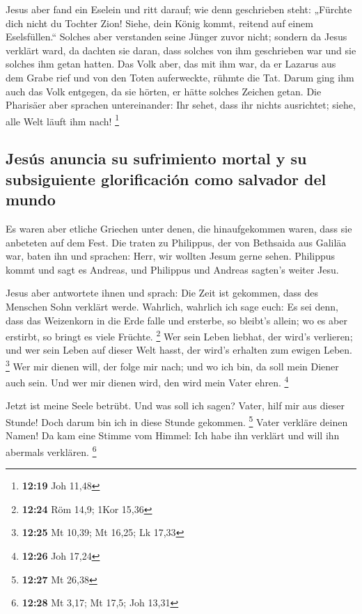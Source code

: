  Jesus aber fand ein Eselein und ritt darauf; wie denn
geschrieben steht:  „Fürchte dich nicht du Tochter Zion!
Siehe, dein König kommt, reitend auf einem Eselsfüllen.``
 Solches aber verstanden seine Jünger zuvor nicht;
sondern da Jesus verklärt ward, da dachten sie daran, dass solches von
ihm geschrieben war und sie solches ihm getan hatten. 
Das Volk aber, das mit ihm war, da er Lazarus aus dem Grabe rief und von
den Toten auferweckte, rühmte die Tat.  Darum ging ihm
auch das Volk entgegen, da sie hörten, er hätte solches Zeichen getan.
 Die Pharisäer aber sprachen untereinander: Ihr sehet,
dass ihr nichts ausrichtet; siehe, alle Welt läuft ihm nach! \footnote{\textbf{12:19}
  Joh 11,48}

\hypertarget{jesuxfas-anuncia-su-sufrimiento-mortal-y-su-subsiguiente-glorificaciuxf3n-como-salvador-del-mundo}{%
\subsection{Jesús anuncia su sufrimiento mortal y su subsiguiente
glorificación como salvador del
mundo}\label{jesuxfas-anuncia-su-sufrimiento-mortal-y-su-subsiguiente-glorificaciuxf3n-como-salvador-del-mundo}}

 Es waren aber etliche Griechen unter denen, die
hinaufgekommen waren, dass sie anbeteten auf dem Fest. 
Die traten zu Philippus, der von Bethsaida aus Galiläa war, baten ihn
und sprachen: Herr, wir wollten Jesum gerne sehen. 
Philippus kommt und sagt es Andreas, und Philippus und Andreas sagten's
weiter Jesu.

 Jesus aber antwortete ihnen und sprach: Die Zeit ist
gekommen, dass des Menschen Sohn verklärt werde. 
Wahrlich, wahrlich ich sage euch: Es sei denn, dass das Weizenkorn in
die Erde falle und ersterbe, so bleibt's allein; wo es aber erstirbt, so
bringt es viele Früchte. \footnote{\textbf{12:24} Röm 14,9; 1Kor 15,36}
 Wer sein Leben liebhat, der wird's verlieren; und wer
sein Leben auf dieser Welt hasst, der wird's erhalten zum ewigen Leben.
\footnote{\textbf{12:25} Mt 10,39; Mt 16,25; Lk 17,33} 
Wer mir dienen will, der folge mir nach; und wo ich bin, da soll mein
Diener auch sein. Und wer mir dienen wird, den wird mein Vater ehren.
\footnote{\textbf{12:26} Joh 17,24}

 Jetzt ist meine Seele betrübt. Und was soll ich sagen?
Vater, hilf mir aus dieser Stunde! Doch darum bin ich in diese Stunde
gekommen. \footnote{\textbf{12:27} Mt 26,38}  Vater
verkläre deinen Namen! Da kam eine Stimme vom Himmel: Ich habe ihn
verklärt und will ihn abermals verklären. \footnote{\textbf{12:28} Mt
  3,17; Mt 17,5; Joh 13,31}


